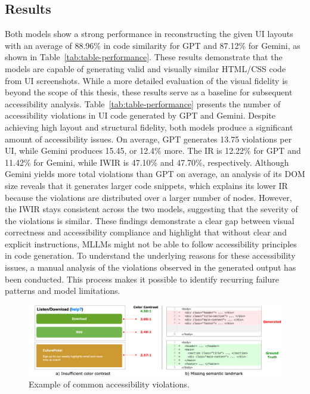 \subsection{Results}
Both models show a strong performance in reconstructing the given 
UI layouts with an average of 88.96\% in code similarity
for GPT and 87.12\% for Gemini, as shown in Table~\ref{tab:table-performance}.
These results demonstrate that the models are capable of generating 
valid and visually similar HTML/CSS code from UI screenshots. 
While a more detailed evaluation of the visual fidelity is beyond 
the scope of this thesis, these results serve as a baseline 
for subsequent accessibility analysis.
Table~\ref{tab:table-performance} presents the number of accessibility 
violations in UI code generated by GPT and Gemini. Despite 
achieving high layout and structural fidelity, both models produce 
a significant amount of accessibility issues. On average, GPT 
generates 13.75 violations per UI, while Gemini produces 15.45, or 12.4\% 
more. The IR is 12.22\% for GPT and 11.42\% for Gemini,
while IWIR is 47.10\% and 47.70\%, respectively. Although Gemini yields
more total violations than GPT on average, an analysis of its DOM size 
reveals that it generates larger code snippets, which explains
its lower IR because the violations are distributed over a larger 
number of nodes. However, the IWIR stays consistent across the two models, 
suggesting that the severity of the violations is similar.
These findings demonstrate a clear gap between visual correctness and 
accessibility compliance and highlight that without clear and 
explicit instructions, MLLMs might not be able to follow 
accessibility principles in code generation. To understand 
the underlying reasons for these accessibility issues, a manual 
analysis of the violations observed in the generated output
has been conducted. This process makes it possible to identify recurring 
failure patterns and model limitations.

\begin{figure}
  \centering
  \includegraphics[width=0.9\linewidth]{figures/colorcontrastlandmarkexample.png}
  \caption{Example of common accessibility violations.}
  \label{fig:common} 
\end{figure}

